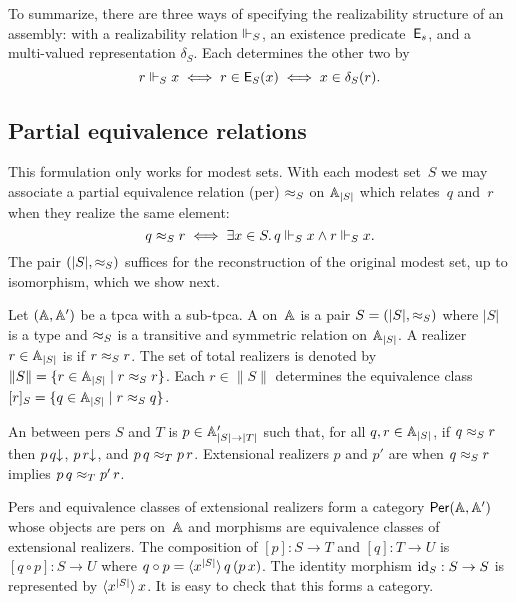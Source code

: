 To summarize, there are three ways of specifying the realizability structure of an assembly: with a realizability relation $\rz_S$, an existence predicate~$\Ex_s$, and a multi-valued representation $\delta_S$. Each determines the other two by
%
\begin{equation*}
  r \rz_S x \iff
  r \in \Ex_S(x) \iff
  x \in \delta_S(r).
\end{equation*}


\subsection{Partial equivalence relations}
\label{sec:pers}

This formulation only works for modest sets. With each modest set~$S$ we may associate a partial equivalence relation (per) $\per_S$ on $\xAtyp{S}$ which relates~$q$ and~$r$ when they realize the same element:
%
\begin{equation*}
  q \per_S r \iff
  \some{x \in S} q \rz_S x \land r \rz_S x.
\end{equation*}
%
The pair $(|S|, {\per_S})$ suffices for the reconstruction of the
original modest set, up to isomorphism, which we show next.

Let $(\AA, \subAA)$ be a tpca with a sub-tpca. A  on~$\AA$ is a pair $S = (|S|, {\per_S})$ where
$|S|$ is a type and $\per_S$ is a transitive and symmetric
relation on $\xAtyp{S}$. A realizer $r \in \xAtyp{S}$ is  if
$r \per_S r$. The set of total realizers is denoted by $\|S\| = \set{r
  \in \xAtyp{S} \such r \per_S r}$. Each $r \in \|S\|$ determines
the equivalence class $[r]_S = \set{q \in \xAtyp{S} \such r \per_S q}$.

An  between pers $S$ and $T$ is $p \in
\subAtyp{|S| \to |T|}$ such that, for all $q, r \in \xAtyp{S}$, if $q
\per_S r$ then $\defined{p\,q}$, $\defined{p\,r}$, and $p\,q \per_T
p\,r$. Extensional realizers $p$ and $p'$ are  when
$q \per_S r$ implies $p\,q \per_T p'\,r$.

Pers and equivalence classes of extensional realizers form a category
$\Per{\AA, \subAA}$ whose objects are pers on~$\AA$ and morphisms are
equivalence classes of extensional realizers. The composition of $[p]
: S \to T$ and $[q] : T \to U$ is $[q \circ p] : S \to U$ where $q
\circ p = \tpcalam{x}{|S|}{q\,(p\,x)}$. The identity morphism
$\id[S] : S \to S$ is represented by $\tpcalam{x}{|S|} x$. It
is easy to check that this forms a category.

